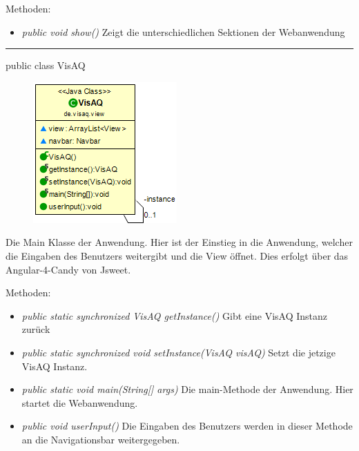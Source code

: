 Methoden:
\begin{itemize}
    \item \emph{public void show()} Zeigt die unterschiedlichen Sektionen der Webanwendung
\end{itemize}

\rule{\textwidth}{0.4pt}
public class VisAQ

\begin{minipage}{0.3\textwidth}
    \begin{figure}[H]
        \includegraphics[scale = 0.6]{media/frontend/view/de.view/VisAQ_Class.png}
    \end{figure}
\end{minipage} \hfill
\begin{minipage}{0.6\textwidth}
    Die Main Klasse der Anwendung. Hier ist der Einstieg in die Anwendung, welcher die Eingaben des Benutzers weitergibt und die View öffnet. Dies erfolgt über das \gls{Angular-4-Candy} von \gls{Jsweet}.
\end{minipage}

Methoden:
\begin{itemize}
    \item \emph{public static synchronized VisAQ getInstance()} Gibt eine VisAQ Instanz zurück
    \item \emph{public static synchronized void setInstance(VisAQ visAQ)} Setzt die jetzige VisAQ Instanz.
    \item \emph{public static void main(String[] args)} Die main-Methode der Anwendung. Hier startet die Webanwendung.
    \item \emph{public void userInput()} Die Eingaben des Benutzers werden in dieser Methode an die Navigationsbar weitergegeben.
\end{itemize}

